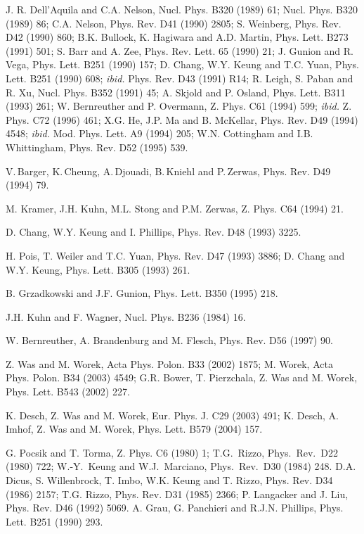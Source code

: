 \begin{thebibliography}{999}
 J. R. Dell'Aquila and C.A. Nelson, Nucl. Phys. B320 (1989) 61; 
\ib Nucl. Phys. B320 (1989) 86; C.A. Nelson, Phys. Rev. D41 (1990) 2805; S. 
Weinberg, Phys. Rev. D42 (1990) 860; B.K. Bullock, K. Hagiwara and A.D. Martin,
Phys. Lett. B273 (1991) 501; S. Barr and A. Zee, Phys. Rev. Lett. 65 (1990) 21; 
J. Gunion and R. Vega, Phys. Lett. B251 (1990) 157; 
D. Chang, W.Y. Keung and T.C. Yuan, Phys. Lett. B251 (1990) 608; {\it ibid.} 
Phys. Rev. D43 (1991) R14; R. Leigh, S. Paban and R. Xu, Nucl. Phys. B352 
(1991) 45; A. Skjold and P. Osland, Phys. Lett.  B311 (1993) 261; W. 
Bernreuther and P. Overmann, Z. Phys. C61 (1994) 599; {\it ibid.} Z.  Phys. C72
(1996) 461; X.G. He, J.P. Ma and B. McKellar, Phys. Rev. D49 (1994) 4548; {\it 
ibid.} Mod. Phys. Lett. A9 (1994) 205; W.N. Cottingham and I.B. Whittingham, 
Phys. Rev. D52 (1995) 539.  

 V.\,Barger, K.\,Cheung, A.\,Djouadi, B.\,Kniehl and 
P.\,Zerwas, Phys. Rev. D49 (1994) 79.

 M. Kramer, J.H. Kuhn, M.L. Stong and P.M. Zerwas, 
Z. Phys. C64 (1994) 21. 

D. Chang, W.Y. Keung and I. Phillips, Phys. Rev. D48  (1993) 3225. 

H. Pois, T. Weiler and T.C. Yuan, Phys. Rev. D47 (1993) 3886;
D. Chang and W.Y. Keung, Phys. Lett. B305 (1993) 261.    

B. Grzadkowski and J.F. Gunion, Phys. Lett. B350 (1995) 218.

 J.H. Kuhn and F. Wagner, Nucl. Phys. B236 (1984) 16.  

 W. Bernreuther, A. Brandenburg and 
M. Flesch, Phys. Rev. D56 (1997) 90. 

Z. Was and M. Worek, Acta Phys. Polon. B33 (2002) 1875; 
M. Worek, Acta Phys. Polon. B34 (2003) 4549; 
G.R. Bower, T. Pierzchala, Z. Was and M. Worek, Phys. Lett. B543 (2002) 227.

K. Desch, Z. Was and M. Worek, Eur. Phys. J. C29 (2003) 491;
K. Desch, A. Imhof, Z. Was and M. Worek,  Phys. Lett. B579 (2004) 157.

 G. Pocsik and T. Torma, Z. Phys. C6 (1980) 1;  
T.G.~Rizzo, Phys.~Rev.~D22 (1980) 722;
W.-Y.~Keung and W.J.~Marciano, Phys.~Rev.~D30 (1984) 248.
%
 D.A. Dicus, S. Willenbrock, T. Imbo, W.K. Keung
and T. Rizzo, Phys. Rev. D34 (1986) 2157; T.G. Rizzo, Phys. Rev. D31 (1985) 
2366; P. Langacker and J. Liu, Phys. Rev. D46 (1992) 5069. 
%
A. Grau, G. Panchieri and R.J.N. Phillips, Phys. Lett. B251 (1990) 293.  


\end{thebibliography}
